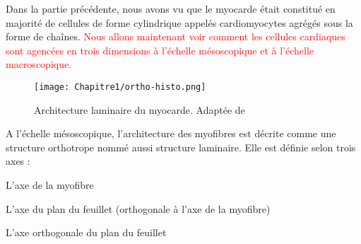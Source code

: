Dans la partie précédente, nous avons vu que le myocarde était constitué en majorité de cellules de forme cylindrique 
appelés cardiomyocytes agrégés sous la forme de chaînes.
 \textcolor{red}{Nous allons maintenant voir comment les cellules cardiaques sont agencées en trois dimensions
  à l’échelle mésoscopique et à l'échelle macroscopique.}\\

  \begin{figure}[!h]
    \begin{center}
      \texttt{[image: Chapitre1/ortho-histo.png]}
    \end{center}
    \caption{Architecture laminaire du myocarde. Adaptée de }
    \label{fig:model_fibre}
  \end{figure}


A l’échelle mésoscopique, l’architecture des myofibres est décrite comme une structure orthotrope nommé aussi
 structure laminaire\cite{NiellesVallespin2019}. Elle est définie selon trois axes : 

\begin{bulletList}
 \item L’axe de la myofibre
 \item L’axe du plan du feuillet (orthogonale à l’axe de la myofibre)
 \item L’axe orthogonale du plan du feuillet
\end{bulletList}

